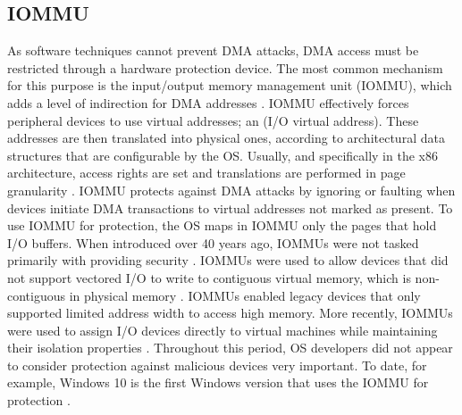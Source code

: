  \subsection{IOMMU}
As software techniques cannot prevent DMA attacks, DMA access must be restricted through a hardware protection device. The most common mechanism for this purpose is the input/output memory management unit (IOMMU), which adds a level of indirection for DMA addresses \cite{WRC08,YZ15,SB12,MTF12}. IOMMU effectively forces peripheral devices to use virtual addresses; an \iova(I/O virtual address). These addresses are then translated into physical ones, according to architectural data structures that are configurable by the OS. Usually, and specifically in the x86 architecture, access rights are set and translations are performed in page granularity \cite{Int16b, AMD16}. 
IOMMU protects against DMA attacks by ignoring or faulting when devices initiate DMA transactions to virtual addresses not marked as present. To use IOMMU for protection, the OS maps in IOMMU only the pages that hold I/O buffers. When introduced over 40 years ago, IOMMUs were not tasked primarily with providing security \cite{DWT79}. IOMMUs were used to allow devices that did not support vectored I/O to write to contiguous virtual memory, which is non-contiguous in physical memory \cite{Chu96, WMM97}. IOMMUs enabled legacy devices that only supported limited address width to access high memory. More recently, IOMMUs were used to assign I/O devices directly to virtual machines while maintaining their isolation properties \cite{Int16b, AMD16}. Throughout this period, OS developers did not appear to consider protection against malicious devices very important. To date, for example, Windows 10 is the first Windows version that uses the IOMMU for protection \cite{Mic17}.

